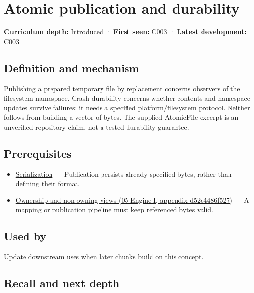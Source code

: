 \hypertarget{appendix-e89a8f290ef5}{}
\section{Atomic publication and durability}\label{appendix-e89a8f290ef5-atomic-publication-and-durability}

\textbf{Curriculum depth:} Introduced · \textbf{First seen:} C003 · \textbf{Latest development:} C003

\subsection{Definition and mechanism}\label{appendix-e89a8f290ef5-definition-and-mechanism}

Publishing a prepared temporary file by replacement concerns observers of the filesystem namespace. Crash durability concerns whether contents and namespace updates survive failures; it needs a specified platform/filesystem protocol. Neither follows from building a vector of bytes. The supplied AtomicFile excerpt is an unverified repository claim, not a tested durability guarantee.

\subsection{Prerequisites}\label{appendix-e89a8f290ef5-prerequisites}

\begin{itemize}
\tightlist
\item
  \hyperref[appendix-91d09ebed979]{Serialization} --- Publication persists already-specified bytes, rather than defining their format.
\item
  \href{../05-Engine-I/main.pdf\#nameddest=appendix-d52e4486f527}{Ownership and non-owning views (05-Engine-I, appendix-d52e4486f527)} --- A mapping or publication pipeline must keep referenced bytes valid.
\end{itemize}

\subsection{Used by}\label{appendix-e89a8f290ef5-used-by}

Update downstream uses when later chunks build on this concept.

\subsection{Recall and next depth}\label{appendix-e89a8f290ef5-recall-and-next-depth}

